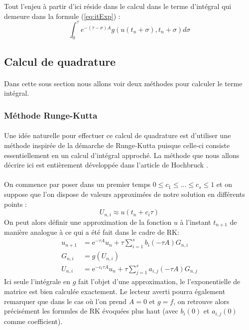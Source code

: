     Tout l'enjeu à partir d'ici réside dans le calcul dans le terme d'intégral qui demeure dans la formule (\ref{eq:itExp}) :
    $$\int_{0}^{\tau} e^{-(\tau-\sigma) A} g\left(u\left(t_{n}+\sigma\right),t_n+\sigma\right) d \sigma$$


\subsection{Calcul de quadrature}

    \paragraph{}
    Dans cette sous section nous allons voir deux méthodes pour calculer le terme intégral.

    \subsubsection{Méthode Runge-Kutta}
        \paragraph{}
        Une idée naturelle pour effectuer ce calcul de quadrature est d'utiliser une méthode inspirée de la démarche de Runge-Kutta puisque celle-ci consiste essentiellement en un calcul d'intégral approché. La méthode que nous allons décrire ici est entièrement développée dans l'article de Hochbruck \cite{ExpIntegrators}.

        \paragraph{}
        On commence par poser dans un premier temps $0 \leq c_1 \leq ... \leq c_s \leq 1$
et on suppose que l'on dispose de valeurs approximées de notre solution en différents points :
        \begin{equation}
            U_{n,i} \approx u(t_n + c_i \tau)
        \end{equation}
        On peut alors définir une approximation de la fonction $u$ à l'instant $t_{n+1}$ de manière analogue à ce qui a été fait dans le cadre de RK:
        \begin{equation} 
            \begin{aligned} u_{n+1} &=\mathrm{e}^{-\tau A} u_{n}+\tau \sum_{i=1}^{s} b_{i}(-\tau A) G_{n,i} \\
            G_{n,i} &=g\left(U_{n,i}\right) \\
            U_{n,i} &=\mathrm{e}^{-c_{t} \tau A} u_{n}+\tau \sum_{j=1}^{s} a_{i,j}(-\tau A) G_{n,j} \end{aligned}
        \end{equation}
        Ici seule l'intégrale en $g$ fait l'objet d'une approximation, le l'exponentielle de matrice est bien calculée exactement. Le lecteur averti pourra également remarquer que dans le cas où l'on prend $A=0$ et $g=f$, on retrouve alors précisément les formules de RK évoquées plus haut (avec $b_i(0)$ et $a_{i,j}(0)$ comme coefficient).

